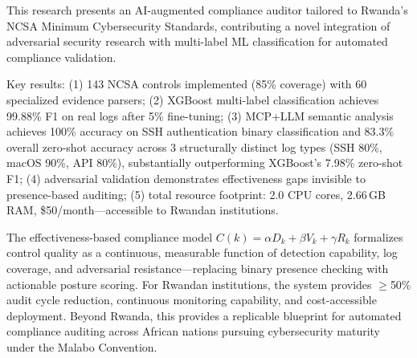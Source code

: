 \documentclass[futureinternet,article,submit,pdftex,moreauthors]{Definitions/mdpi}
\begin{document}
This research presents an AI-augmented compliance auditor tailored to Rwanda's NCSA Minimum
Cybersecurity Standards, contributing a novel integration of adversarial security research
with multi-label ML classification for automated compliance validation.

Key results: (1) 143 NCSA controls implemented (85\% coverage) with 60 specialized evidence
parsers; (2) XGBoost multi-label classification achieves 99.88\% F1 on real logs after 5\%
fine-tuning; (3) MCP+LLM semantic analysis achieves 100\% accuracy on SSH authentication
binary classification and 83.3\% overall zero-shot accuracy across 3 structurally distinct
log types (SSH 80\%, macOS 90\%, API 80\%), substantially outperforming XGBoost's 7.98\%
zero-shot F1; (4) adversarial validation demonstrates effectiveness gaps invisible to
presence-based auditing; (5) total resource footprint: 2.0 CPU cores, 2.66\,GB RAM,
\$50/month---accessible to Rwandan institutions.

The effectiveness-based compliance model $C(k) = \alpha D_k + \beta V_k + \gamma R_k$
formalizes control quality as a continuous, measurable function of detection capability, log
coverage, and adversarial resistance---replacing binary presence checking with actionable
posture scoring. For Rwandan institutions, the system provides $\geq$50\% audit cycle
reduction, continuous monitoring capability, and cost-accessible deployment. Beyond Rwanda,
this provides a replicable blueprint for automated compliance auditing across African nations
pursuing cybersecurity maturity under the Malabo Convention.

\vspace{6pt}





\end{document}
